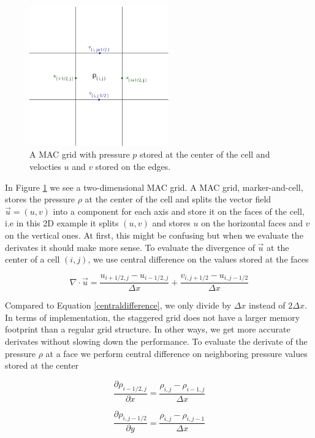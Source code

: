 \begin{figure}[ht!]
\centering
\includegraphics[width=60mm]{img/mac2.pdf}
\caption{A MAC grid with pressure $p$ stored at the center of the cell and velocties $u$ and $v$ stored on the edges.}
\label{macgrid}
\end{figure}

In Figure \ref{macgrid} we see a two-dimensional MAC grid. A MAC grid, marker-and-cell, stores the pressure $\rho$ at the center of the cell and splits the vector field $\vec{u} = (u,v)$ into a component for each axis and store it on the faces of the cell, i.e in this 2D example it splits $(u,v)$ and stores $u$ on the horizontal faces and $v$ on the vertical ones. At first, this might be confusing but when we evaluate the derivates it should make more sense. To evaluate the divergence of $\vec{u}$ at the center of a cell $(i,j)$, we use central difference on the values stored at the faces

\begin{equation}
\nabla \cdot \vec{u} = \frac{u_{i+1/2,j} - u_{i-1/2,j}}{\Delta x} + 
                       \frac{v_{i,j+1/2} - u_{i,j-1/2}}{\Delta x}
\end{equation}

Compared to Equation \ref{centraldifference}, we only divide by $\Delta x$ instead of $2\Delta x$. In terms of implementation, the staggered grid does not have a larger memory footprint than a regular grid structure. In other ways, we get more accurate derivates without slowing down the performance. To evaluate the derivate of the pressure $\rho$ at a face we perform central difference on neighboring pressure values stored at the center

\begin{equation}
\frac{\partial \rho_{i-1/2,j}}{\partial x} = \frac{\rho_{i,j} - \rho_{i-1,j}}{\Delta x}
\end{equation}

\begin{equation}
\frac{\partial \rho_{i,j-1/2}}{\partial y} = \frac{\rho_{i,j} - \rho_{i,j-1}}{\Delta x}
\end{equation}

